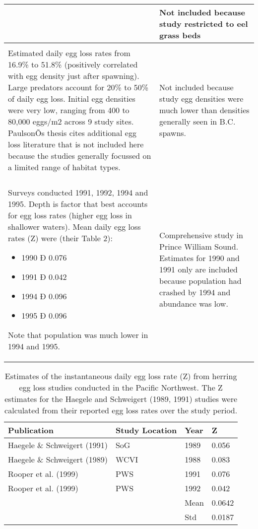 \begin{table}[htdp]
\begin{center}
\begin{tabular}{|p{}|p{}|}
&
Not included because study restricted to eel grass beds\\
\hline
\cite{palsson1984egg}  & \\
Estimated daily egg loss rates from 16.9\% to 51.8\% (positively correlated with egg density just after spawning).  Large predators account for 20\% to 50\% of daily egg loss.  Initial egg densities were very low, ranging from 400 to 80,000 eggs/m2 across 9 study sites.  PaulsonÕs thesis cites additional egg loss literature that is not included here because the studies generally focussed on a limited range of habitat types.
&
Not included because study egg densities were much lower than densities generally seen in B.C. spawns.\\
\hline
\cite{rooper1999habitat}& \\
Surveys conducted 1991, 1992, 1994 and 1995.  Depth is factor that best accounts for egg loss rates (higher egg loss in shallower waters).  Mean daily egg loss rates (Z) were (their Table 2):
\begin{itemize}
\item 1990 Ð 0.076
\item 1991 Ð 0.042
\item 1994 Ð 0.096
\item 1995 Ð 0.096 
\end{itemize}
Note that population was much lower in 1994 and 1995.
&
Comprehensive study in Prince William Sound.  Estimates for 1990 and 1991 only are included because population had crashed by 1994 and abundance was low.
\\
\hline
\end{tabular}
\end{center}
\label{AppendixC:Table3}
\end{table}



\begin{table}[htdp]
\caption{Estimates of the instantaneous daily egg loss rate (Z) from herring egg loss studies conducted in the Pacific Northwest. The Z estimates for the Haegele and Schweigert (1989, 1991) studies were calculated from their reported egg loss rates over the study period.}
\begin{center}
\begin{tabular}{llll}
\hline
Publication	&Study Location&	Year	&Z\\
\hline
Haegele \& Schweigert (1991) &	SoG &	1989	&0.056\\
Haegele \& Schweigert (1989)&WCVI&	1988&	0.083\\
Rooper et al. (1999)&	PWS	&1991	&0.076\\
Rooper et al. (1999)&	PWS	&1992	&0.042\\
\hline
& & Mean & 0.0642\\
& & Std & 0.0187\\
\hline
\end{tabular}
\end{center}
\label{AppendixC:Table4}
\end{table}%

